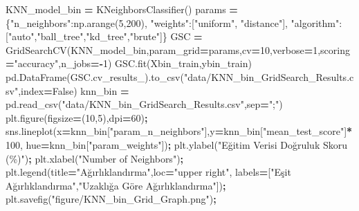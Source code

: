 \documentclass[12pt,twoside]{deuthesis}
\newenvironment{Shaded}{\begin{snugshade}}{\end{snugshade}}
\newcommand{\DecValTok}[1]{\textcolor[rgb]{0.00,0.00,0.81}{#1}}
\newcommand{\NormalTok}[1]{#1}
\newcommand{\OperatorTok}[1]{\textcolor[rgb]{0.81,0.36,0.00}{\textbf{#1}}}
\newcommand{\StringTok}[1]{\textcolor[rgb]{0.31,0.60,0.02}{#1}}
\newcommand{\VariableTok}[1]{\textcolor[rgb]{0.00,0.00,0.00}{#1}}
\begin{document}
\scriptsize
\begin{Shaded}
\begin{Highlighting}[]
\NormalTok{KNN\_model\_bin }\OperatorTok{=}\NormalTok{ KNeighborsClassifier()}
\NormalTok{params }\OperatorTok{=}\NormalTok{ \{}\StringTok{"n\_neighbors"}\NormalTok{:np.arange(}\DecValTok{5}\NormalTok{,}\DecValTok{200}\NormalTok{),}
          \StringTok{"weights"}\NormalTok{:[}\StringTok{"uniform"}\NormalTok{, }\StringTok{"distance"}\NormalTok{],}
          \StringTok{"algorithm"}\NormalTok{:[}\StringTok{"auto"}\NormalTok{,}\StringTok{"ball\_tree"}\NormalTok{,}\StringTok{"kd\_tree"}\NormalTok{,}\StringTok{"brute"}\NormalTok{]\}}
\NormalTok{GSC }\OperatorTok{=}\NormalTok{ GridSearchCV(KNN\_model\_bin,param\_grid}\OperatorTok{=}\NormalTok{params,cv}\OperatorTok{=}\DecValTok{10}\NormalTok{,verbose}\OperatorTok{=}\DecValTok{1}\NormalTok{,scoring}\OperatorTok{=}\StringTok{"accuracy"}\NormalTok{,n\_jobs}\OperatorTok{={-}}\DecValTok{1}\NormalTok{)}
\NormalTok{GSC.fit(Xbin\_train,ybin\_train)}
\NormalTok{pd.DataFrame(GSC.cv\_results\_).to\_csv(}\StringTok{"data/KNN\_bin\_GridSearch\_Results.csv"}\NormalTok{,index}\OperatorTok{=}\VariableTok{False}\NormalTok{)}
\NormalTok{knn\_bin }\OperatorTok{=}\NormalTok{ pd.read\_csv(}\StringTok{"data/KNN\_bin\_GridSearch\_Results.csv"}\NormalTok{,sep}\OperatorTok{=}\StringTok{";"}\NormalTok{)}
\NormalTok{plt.figure(figsize}\OperatorTok{=}\NormalTok{(}\DecValTok{10}\NormalTok{,}\DecValTok{5}\NormalTok{),dpi}\OperatorTok{=}\DecValTok{60}\NormalTok{)}\OperatorTok{;}
\NormalTok{sns.lineplot(x}\OperatorTok{=}\NormalTok{knn\_bin[}\StringTok{"param\_n\_neighbors"}\NormalTok{],y}\OperatorTok{=}\NormalTok{knn\_bin[}\StringTok{"mean\_test\_score"}\NormalTok{]}\OperatorTok{*}\DecValTok{100}\NormalTok{,}
\NormalTok{             hue}\OperatorTok{=}\NormalTok{knn\_bin[}\StringTok{"param\_weights"}\NormalTok{])}\OperatorTok{;}
\NormalTok{plt.ylabel(}\StringTok{"Eğitim Verisi Doğruluk Skoru (\%)"}\NormalTok{)}\OperatorTok{;}
\NormalTok{plt.xlabel(}\StringTok{"Number of Neighbors"}\NormalTok{)}\OperatorTok{;}
\NormalTok{plt.legend(title}\OperatorTok{=}\StringTok{"Ağırlıklandırma"}\NormalTok{,loc}\OperatorTok{=}\StringTok{"upper right"}\NormalTok{,}
\NormalTok{           labels}\OperatorTok{=}\NormalTok{[}\StringTok{"Eşit Ağırlıklandırma"}\NormalTok{,}\StringTok{"Uzaklığa Göre Ağırlıklandırma"}\NormalTok{])}\OperatorTok{;}
\NormalTok{plt.savefig(}\StringTok{"figure/KNN\_bin\_Grid\_Graph.png"}\NormalTok{)}\OperatorTok{;}
\end{Highlighting}
\end{Shaded}
\end{document}
